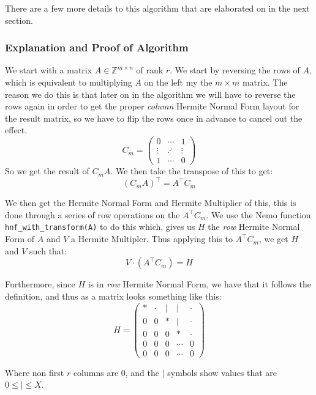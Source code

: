 \documentclass[oneside, a4paper, onecolumn, 11pt]{article}
\newcommand{\Zmn}[2]{\mathbb{Z}^{#1 \times #2}}
\begin{document}
There are a few more details to this algorithm that are elaborated on in the next section.

\subsubsection{Explanation and Proof of Algorithm}

We start with a matrix \(A \in \Zmn{m}{n}\) of rank \(r\). We start by reversing the rows of \(A\), which is equivalent to multiplying \(A\) on the left my the \(m \times m\) matrix. The reason we do this is that later on in the algorithm we will have to reverse the rows again in order to get the proper \textit{column} Hermite Normal Form layout for the result matrix, so we have to flip the rows once in advance to cancel out the effect.
\[
    C_m = \begin{pmatrix}
        0      & \cdots  & 1      \\
        \vdots & \iddots & \vdots \\
        1      & \cdots  & 0
    \end{pmatrix}
\]
So we get the result of \(C_m A\). We then take the transpose of this to get:
\[
    (C_m A)^\intercal = A^\intercal C_m
\]

We then get the Hermite Normal Form and Hermite Multiplier of this, this is done through a series of row operations on the \(A^\intercal C_m\). We use the Nemo function \texttt{hnf\_with\_transform(A)} to do this which, gives us \(H\) the \textit{row} Hermite Normal Form of \(A\) and \(V\) a Hermite Multipler. Thus applying this to \(A^\intercal C_m\), we get \(H\) and \(V\) such that:
\[
    V \cdot (A^\intercal C_m) = H
\]

Furthermore, since \(H\) is in \textit{row} Hermite Normal Form, we have that it follows the definition, and thus as a matrix looks something like this:
\[
    H = \left(
    \begin{array}{ccccc}
            * & \cdot & | & |      & \cdot \\
            0 & 0     & * & |      & \cdot \\
            0 & 0     & 0 & *      & \cdot \\
            0 & 0     & 0 & \cdots & 0     \\
            0 & 0     & 0 & \cdots & 0
        \end{array}
    \right)
\]

Where non first \(r\) columns are \(0\), and the \(|\) symbols show values that are \(0 \le | \le X\).
\end{document}
